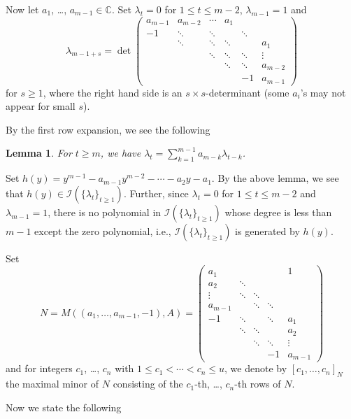 \documentclass[a4paper,12pt]{article}
\newcommand{\CCC}{\mathbb{C}}
\newcommand{\msIII}{\mathscr{I}}
\newtheorem{lemma}[thm]{Lemma}
\begin{document}
Now let $a_1$, \ldots, $a_{m-1}\in\CCC$.
Set $\lambda_t=0$ for $1\leq t\leq m-2$, $\lambda_{m-1}=1$ and
$$
\lambda_{m-1+s}=
\det\begin{pmatrix}
a_{m-1}&a_{m-2}&\cdots&a_1\\
-1&\ddots&\ddots&&\ddots\\
&\ddots&\ddots&\ddots&&a_1\\
&&\ddots&\ddots&\ddots&\vdots\\
&&&\ddots&\ddots&a_{m-2}\\
&&&&-1&a_{m-1}
\end{pmatrix}
$$
for $s\geq 1$,
where the right hand side is an $s\times s$-determinant
(some $a_i$'s may not appear for small $s$).

By the first row expansion, we see the following

\begin{lemma}
\label{lem:rec rel}
For $t\geq m$, we have
$\lambda_t=\sum_{k=1}^{m-1}a_{m-k}\lambda_{t-k}$.
\end{lemma}
%
%
Set
$h(y)=y^{m-1}-a_{m-1}y^{m-2}-\cdots-a_2y-a_1$.
By the above lemma, we see that $h(y)\in\msIII(\{\lambda_t\}_{t\geq 1})$.
Further, since $\lambda_t=0$ for $1\leq t\leq m-2$ and $\lambda_{m-1}=1$,
there is no polynomial in $\msIII(\{\lambda_t\}_{t\geq 1})$ whose degree
is less than $m-1$ except the zero polynomial,
i.e.,
$\msIII(\{\lambda_t\}_{t\geq 1})$ is generated by $h(y)$.

Set 
$$
N=M((a_1,\ldots, a_{m-1},-1),A)
=\begin{pmatrix}a_1&&&&1\\
a_2&\ddots\\
\vdots&\ddots&\ddots\\
a_{m-1}&&\ddots&\ddots\\
-1&\ddots&&\ddots&a_1\\
&\ddots&\ddots&&a_2\\
&&\ddots&\ddots&\vdots\\
&&&-1&a_{m-1}
\end{pmatrix}
$$
and for integers $c_1$, \ldots, $c_n$ with $1\leq c_1<\cdots<c_n\leq u$,
we denote by $[c_1, \ldots, c_n]_N$ the maximal minor of $N$ 
consisting of the $c_1$-th, \ldots, $c_n$-th rows of $N$.

Now we state the following
\end{document}
